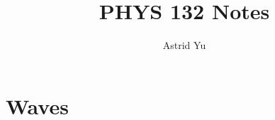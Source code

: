 \documentclass[12pt]{book}
\title{PHYS 132 Notes}
\author{Astrid Yu}
\begin{document}
\maketitle

\tableofcontents

\part{Waves}


\end{document}
